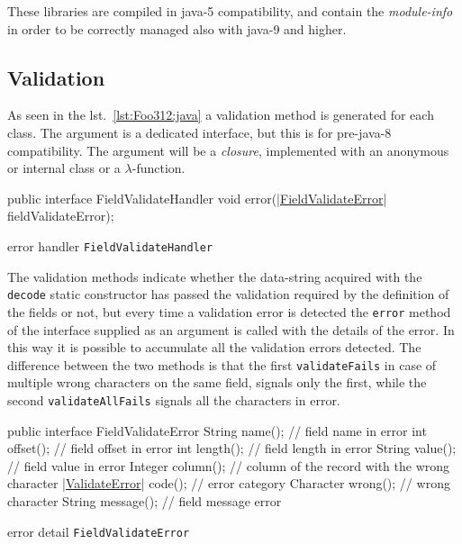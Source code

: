 \documentclass[a4paper,10pt]{report}
\newenvironment{elisting}[1][H]
  {\captionsetup{aboveskip=0pt}\begin{listing}[#1]}
  {\end{listing}%
}
\begin{document}
These libraries are compiled in java-5 compatibility, and contain the 
\textsl{module-info} in order to be correctly managed also with java-9 and 
higher.

\subsection{Validation}
As seen in the lst.~\ref{lst:Foo312:java} a validation method is generated for 
each class. 
The argument is a dedicated interface, but this is for pre-java-8 compatibility. 
The argument will be a \textit{closure}, implemented with an anonymous or 
internal class or a $\lambda$-function.

\begin{elisting}[!htb]
\begin{javacode}
public interface FieldValidateHandler {
    void error(|\hyperref[lst:FieldValidateError:java]{FieldValidateError}| fieldValidateError);
}
\end{javacode}
\caption{error handler \texttt{FieldValidateHandler}}
\label{lst:FieldValidateHandler:java}
\end{elisting}

The validation methods indicate whether the data-string acquired with the 
\texttt{decode} static constructor has passed the validation required by the 
definition of the fields or not, but every time a validation error is detected 
the \texttt{error} method of the interface supplied as an argument is called 
with the details of the error. In this way it is possible to accumulate all the 
validation errors detected. 
The difference between the two methods is that the first \texttt{validateFails} 
in case of multiple wrong characters on the same field, signals only the first, 
while the second \texttt{validateAllFails} signals all the characters in error.

\begin{elisting}[!htb]
\begin{javacode}
public interface FieldValidateError {
    String name();          // field name in error
    int offset();           // field offset in error
    int length();           // field length in error
    String value();         // field value in error
    Integer column();       // column of the record with the wrong character
    |\hyperref[lst:ValidateError:java]{ValidateError}| code();   // error category
    Character wrong();      // wrong character
    String message();       // field message error
}
\end{javacode}
\caption{error detail \texttt{FieldValidateError}}
\label{lst:FieldValidateError:java}
\end{elisting}
\end{document}

